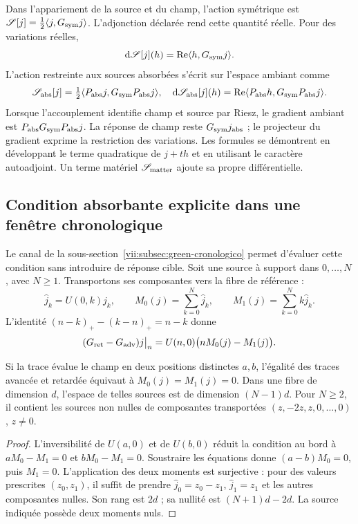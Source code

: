 Dans l'appariement de la source et du champ, l'action symétrique est
\(\mathscr S[j]=\tfrac12\langle j,G_{\rm sym}j\rangle\).
L'adjonction déclarée rend cette quantité réelle. Pour des variations réelles,
\[
 \mathrm d\mathscr S[j](h)
 =\operatorname{Re}\langle h,G_{\rm sym}j\rangle.
\]
L'action restreinte aux sources absorbées s'écrit sur l'espace ambiant comme
\begin{equation}
 \mathscr S_{\rm abs}[j]
 =\tfrac12\langle P_{\rm abs}j,G_{\rm sym}P_{\rm abs}j\rangle,
 \quad
 \mathrm d\mathscr S_{\rm abs}[j](h)
 =\operatorname{Re}\langle P_{\rm abs}h,G_{\rm sym}P_{\rm abs}j\rangle.
 \label{vii:eq:variacion-restringida-absorcion}
\end{equation}
Lorsque l'accouplement identifie champ et source par Riesz, le gradient ambiant est \(P_{\rm abs}G_{\rm sym}P_{\rm abs}j\). La réponse de champ reste \(G_{\rm sym}j_{\rm abs}\) ; le projecteur du gradient exprime la restriction des variations. Les formules se démontrent en développant le terme quadratique de \(j+th\) et en utilisant le caractère autoadjoint. Un terme matériel \(\mathscr S_{\rm matter}\) ajoute sa propre différentielle.

\subsection{Condition absorbante explicite dans une fenêtre chronologique}
\label{vii:subsec:absorcion-momentos}

Le canal de la sous-section~\ref{vii:subsec:green-cronologico} permet
d'évaluer cette condition sans introduire de réponse cible. Soit une
source à support dans \(0,\ldots,N\), avec \(N\geq1\). Transportons
ses composantes vers la fibre de référence :
\[
 \widehat j_k=U(0,k)j_k,\qquad
 M_0(j)=\sum_{k=0}^N\widehat j_k,\qquad
 M_1(j)=\sum_{k=0}^Nk\widehat j_k.
\]
L'identité \((n-k)_+-(k-n)_+=n-k\) donne
\begin{equation}
 (G_{\rm ret}-G_{\rm adv})j\big|_n
 =U(n,0)\bigl(nM_0(j)-M_1(j)\bigr).
 \label{vii:eq:diferencia-green-momentos}
\end{equation}

\begin{proposition}
\label{vii:prop:absorcion-momentos}
Si la trace évalue le champ en deux positions distinctes \(a,b\),
l'égalité des traces avancée et retardée équivaut à
\(M_0(j)=M_1(j)=0\). Dans une fibre de dimension \(d\), l'espace
de telles sources est de dimension \((N-1)d\). Pour \(N\geq2\),
il contient les sources non nulles de composantes transportées
\((z,-2z,z,0,\ldots,0)\), \(z\neq0\).
\end{proposition}
\begin{proof}
L'inversibilité de \(U(a,0)\) et de \(U(b,0)\) réduit la condition
au bord à \(aM_0-M_1=0\) et \(bM_0-M_1=0\).
Soustraire les équations donne \((a-b)M_0=0\), puis \(M_1=0\).
L'application des deux moments est surjective : pour des valeurs prescrites
\((z_0,z_1)\), il suffit de prendre
\(\widehat j_0=z_0-z_1\), \(\widehat j_1=z_1\) et les autres
composantes nulles. Son rang est \(2d\) ; sa nullité est
\((N+1)d-2d\). La source indiquée possède deux moments nuls.
\end{proof}

